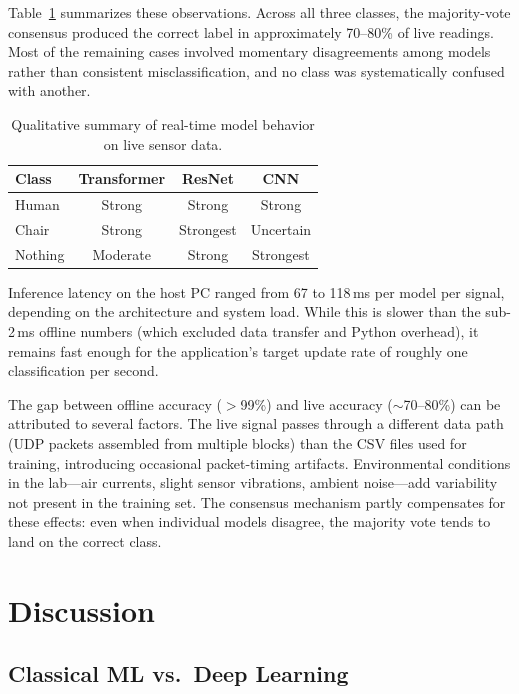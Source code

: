 \documentclass[conference,a4paper]{IEEEtran}
\begin{document}
Table~\ref{tab:realtime_summary} summarizes these observations. Across all three classes, the majority-vote consensus produced the correct label in approximately 70--80\% of live readings. Most of the remaining cases involved momentary disagreements among models rather than consistent misclassification, and no class was systematically confused with another.

\begin{table}[H]
\centering
\caption{Qualitative summary of real-time model behavior on live sensor data.}
\label{tab:realtime_summary}
\begin{tabular}{lccc}
\toprule
\textbf{Class} & \textbf{Transformer} & \textbf{ResNet} & \textbf{CNN} \\
\midrule
Human   & Strong   & Strong    & Strong \\
Chair   & Strong   & Strongest & Uncertain \\
Nothing & Moderate & Strong    & Strongest \\
\bottomrule
\end{tabular}
\end{table}

Inference latency on the host PC ranged from 67 to 118\,ms per model per signal, depending on the architecture and system load. While this is slower than the sub-2\,ms offline numbers (which excluded data transfer and Python overhead), it remains fast enough for the application's target update rate of roughly one classification per second.

The gap between offline accuracy ($>$99\%) and live accuracy ($\sim$70--80\%) can be attributed to several factors. The live signal passes through a different data path (UDP packets assembled from multiple blocks) than the CSV files used for training, introducing occasional packet-timing artifacts. Environmental conditions in the lab---air currents, slight sensor vibrations, ambient noise---add variability not present in the training set. The consensus mechanism partly compensates for these effects: even when individual models disagree, the majority vote tends to land on the correct class.
\section{Discussion}

\subsection{Classical ML vs.\ Deep Learning}
\end{document}
